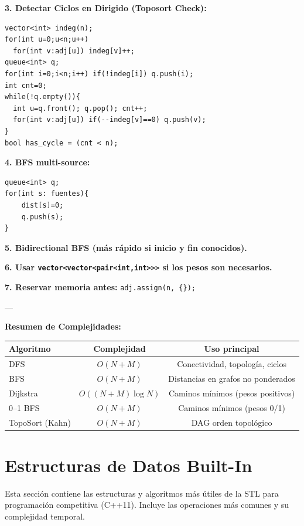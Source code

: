\documentclass{article}
\begin{document}
\textbf{3. Detectar Ciclos en Dirigido (Toposort Check):}
\begin{lstlisting}[style=cppstyle]
vector<int> indeg(n);
for(int u=0;u<n;u++)
  for(int v:adj[u]) indeg[v]++;
queue<int> q;
for(int i=0;i<n;i++) if(!indeg[i]) q.push(i);
int cnt=0;
while(!q.empty()){
  int u=q.front(); q.pop(); cnt++;
  for(int v:adj[u]) if(--indeg[v]==0) q.push(v);
}
bool has_cycle = (cnt < n);
\end{lstlisting}

\textbf{4. BFS multi-source:}
\begin{lstlisting}[style=cppstyle]
queue<int> q;
for(int s: fuentes){
    dist[s]=0;
    q.push(s);
}
\end{lstlisting}

\textbf{5. Bidirectional BFS (más rápido si inicio y fin conocidos).}

\textbf{6. Usar \lstinline|vector<vector<pair<int,int>>>| si los pesos son necesarios.}

\textbf{7. Reservar memoria antes:} \lstinline|adj.assign(n, {});|

---

\textbf{Resumen de Complejidades:}

\begin{center}
\begin{tabular}{lcc}
\hline
Algoritmo & Complejidad & Uso principal \\
\hline
DFS & \(O(N+M)\) & Conectividad, topología, ciclos \\
BFS & \(O(N+M)\) & Distancias en grafos no ponderados \\
Dijkstra & \(O((N+M)\log N)\) & Caminos mínimos (pesos positivos) \\
0–1 BFS & \(O(N+M)\) & Caminos mínimos (pesos 0/1) \\
TopoSort (Kahn) & \(O(N+M)\) & DAG orden topológico \\
\hline
\end{tabular}
\end{center}




\section{Estructuras de Datos Built-In}

Esta sección contiene las estructuras y algoritmos más útiles de la STL para programación competitiva (C++11).  
Incluye las operaciones más comunes y su complejidad temporal.
\end{document}
